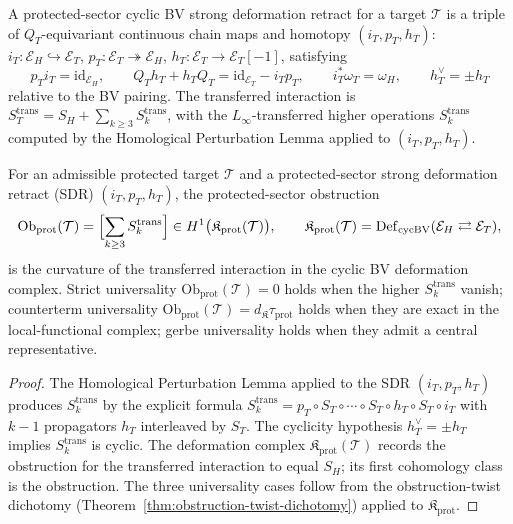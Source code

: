 \begin{defn}
\label{def:completion-protected-sector-sdr}
A protected-sector cyclic BV strong deformation retract for a
target \(\mathcal T\) is a triple of \(Q_T\)-equivariant continuous
chain maps and homotopy
\((i_T,p_T,h_T)\):
\(i_T:\mathcal E_H\hookrightarrow\mathcal E_T\),
\(p_T:\mathcal E_T\twoheadrightarrow\mathcal E_H\),
\(h_T:\mathcal E_T\to\mathcal E_T[-1]\), satisfying
\[
  p_Ti_T=\mathrm{id}_{\mathcal E_H},
  \qquad
  Q_Th_T+h_TQ_T=\mathrm{id}_{\mathcal E_T}-i_Tp_T,
  \qquad
  i_T^*\omega_T=\omega_H,
  \qquad
  h_T^\vee=\pm h_T
\]
relative to the BV pairing.  The transferred interaction is
\(S_T^{\mathrm{trans}}=S_H+\sum_{k\ge 3}S^{\mathrm{trans}}_k\), with
the \(L_\infty\)-transferred higher operations
\(S^{\mathrm{trans}}_k\) computed by the Homological Perturbation
Lemma applied to \((i_T,p_T,h_T)\).
\end{defn}

\begin{thm}
\label{thm:completion-prot-sector-obstruction}
For an admissible protected target \(\mathcal T\) and a
protected-sector strong deformation retract (SDR) \((i_T,p_T,h_T)\),
the protected-sector obstruction
\[
  \mathrm{Ob}_{\mathrm{prot}}(\mathcal T)
  =\Bigl[\sum_{k\ge 3}S^{\mathrm{trans}}_k\Bigr]
  \in H^1\bigl(\mathfrak K_{\mathrm{prot}}(\mathcal T)\bigr),
  \qquad
  \mathfrak K_{\mathrm{prot}}(\mathcal T)
  =\mathrm{Def}_{\mathrm{cycBV}}(\mathcal E_H\rightleftarrows\mathcal E_T),
\]
is the curvature of the transferred interaction in the cyclic BV
deformation complex.  Strict universality
\(\mathrm{Ob}_{\mathrm{prot}}(\mathcal T)=0\) holds when the higher
\(S^{\mathrm{trans}}_k\) vanish; counterterm universality
\(\mathrm{Ob}_{\mathrm{prot}}(\mathcal T)=d_{\mathfrak K}\tau_{\mathrm{prot}}\)
holds when they are exact in the local-functional complex; gerbe
universality holds when they admit a central representative.
\end{thm}

\begin{proof}
The Homological Perturbation Lemma
\cite{crainic-perturbation-lemma}\cite{brown-perturbation-lemma} applied
to the SDR \((i_T,p_T,h_T)\) produces \(S^{\mathrm{trans}}_k\) by
the explicit formula
\(S^{\mathrm{trans}}_k=p_T\circ S_T\circ\cdots\circ S_T\circ h_T\circ S_T\circ i_T\)
with \(k-1\) propagators \(h_T\) interleaved by \(S_T\).  The
cyclicity hypothesis \(h_T^\vee=\pm h_T\) implies
\(S^{\mathrm{trans}}_k\) is cyclic.  The deformation complex
\(\mathfrak K_{\mathrm{prot}}(\mathcal T)\) records the obstruction for
the transferred interaction to equal \(S_H\); its first cohomology
class is the obstruction.  The three universality cases follow
from the obstruction-twist dichotomy
(Theorem~\ref{thm:obstruction-twist-dichotomy}) applied to
\(\mathfrak K_{\mathrm{prot}}\).
\end{proof}

